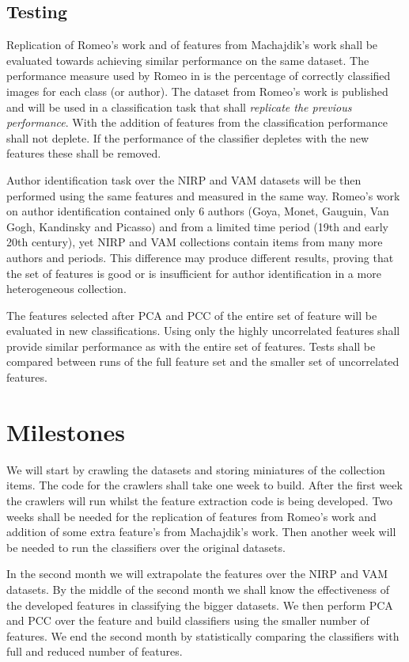 \documentclass[a4paper]{article}
\begin{document}
\subsection{Testing}

Replication of Romeo's work and of features from Machajdik's work shall be
evaluated towards achieving similar performance on the same dataset.  The
performance measure used by Romeo in \cite{rmc12ajs} is the percentage of
correctly classified images for each class (or author).  The dataset from
Romeo's work is published and will be used in a classification task that shall
\emph{replicate the previous performance}.  With the addition of features from
\cite{mach10clas} the classification performance shall not deplete.  If the
performance of the classifier depletes with the new features these shall be
removed.

Author identification task over the NIRP and VAM datasets will be then
performed using the same features and measured in the same way.  Romeo's work
on author identification contained only 6 authors (Goya, Monet, Gauguin, Van
Gogh, Kandinsky and Picasso) and from a limited time period (19th and early
20th century), yet NIRP and VAM collections contain items from many more
authors and periods.  This difference may produce different results, proving
that the set of features is good or is insufficient for author identification
in a more heterogeneous collection.

The features selected after PCA and PCC of the entire set of feature will be
evaluated in new classifications.  Using only the highly uncorrelated features
shall provide similar performance as with the entire set of features.  Tests
shall be compared between runs of the full feature set and the smaller set of
uncorrelated features.

\section{Milestones}

We will start by crawling the datasets and storing miniatures of the collection
items.  The code for the crawlers shall take one week to build.  After the
first week the crawlers will run whilst the feature extraction code is being
developed.  Two weeks shall be needed for the replication of features from
Romeo's work and addition of some extra feature's from Machajdik's work.  Then
another week will be needed to run the classifiers over the original datasets.

In the second month we will extrapolate the features over the NIRP and VAM
datasets.  By the middle of the second month we shall know the effectiveness of
the developed features in classifying the bigger datasets.  We then perform PCA
and PCC over the feature and build classifiers using the smaller number of
features.  We end the second month by statistically comparing the classifiers
with full and reduced number of features.
\end{document}
